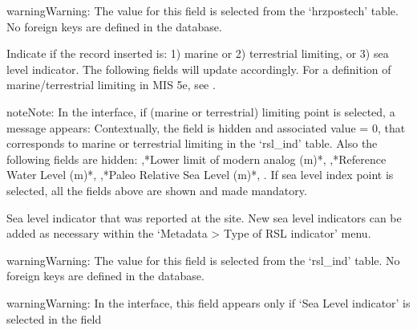 \documentclass[letterpaper,10pt,english]{sphinxmanual}
\begin{document}
\begin{sphinxadmonition}{warning}{Warning:}
The value for this field is selected from the ‘hrzpostech’ table. No foreign keys are defined in the database.
\end{sphinxadmonition}

 \sphinxhyphen{} Indicate if the record inserted is: 1) marine or 2) terrestrial limiting, or 3) sea level indicator. The following fields will update accordingly. For a definition of marine/terrestrial limiting in MIS 5e, see .

\begin{sphinxadmonition}{note}{Note:}
In the interface, if (marine or terrestrial) limiting point is selected, a message appears:  Contextually, the field  is hidden and associated value = 0, that corresponds to marine or terrestrial limiting in the ‘rsl\_ind’ table. Also the following fields are hidden: ,*Lower limit of modern analog (m)*, ,*Reference Water Level (m)*, ,*Paleo Relative Sea Level (m)*, . If sea level index point is selected, all the fields above are shown and made mandatory.
\end{sphinxadmonition}

 \sphinxhyphen{} Sea level indicator that was reported at the site. New sea level indicators can be added as necessary within the ‘Metadata \sphinxhyphen{}\textgreater{} Type of RSL indicator’ menu.

\begin{sphinxadmonition}{warning}{Warning:}
The value for this field is selected from the ‘rsl\_ind’ table. No foreign keys are defined in the database.
\end{sphinxadmonition}

\begin{sphinxadmonition}{warning}{Warning:}
In the interface, this field appears only if ‘Sea Level indicator’ is selected in the field 
\end{sphinxadmonition}
\end{document}
